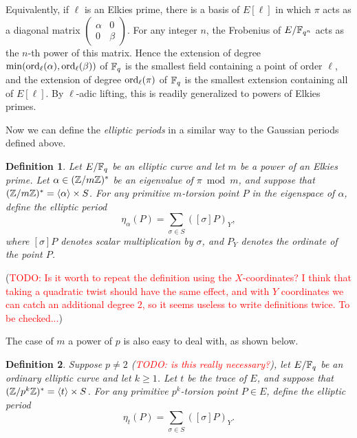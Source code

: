 \documentclass{article}
\newcommand{\todo}[1]{(\textcolor{red}{TODO: #1})}
\newtheorem{Def}{Definition}
\begin{document}
Equivalently, if $\ell$ is an Elkies prime, there is a basis of
$E[\ell]$ in which $\pi$ acts as a diagonal matrix
$\left(\begin{smallmatrix}\alpha&0\\0&\beta\end{smallmatrix}\right)$. For
any integer $n$, the Frobenius of $E/\mathbb{F}_{q^n}$ acts as the $n$-th
power of this matrix. Hence the extension of degree
$\min(\operatorname{ord}_\ell(\alpha),\operatorname{ord}_\ell(\beta))$ of $\mathbb{F}_q$ is the smallest
field containing a point of order $\ell$, and the extension of degree
$\operatorname{ord}_\ell(\pi)$ of $\mathbb{F}_q$ is the smallest extension containing all of
$E[\ell]$. By $\ell$-adic lifting, this is readily generalized to
powers of Elkies primes.

Now we can define the \emph{elliptic periods} in a similar way to the
Gaussian periods defined above.

\begin{Def}
  Let $E/\mathbb{F}_q$ be an elliptic curve and let $m$ be a power of an
  Elkies prime. Let $\alpha\in(\mathbb{Z}/m\mathbb{Z})^\ast$ be an eigenvalue of
  $\pi\bmod m$, and suppose that
  $(\mathbb{Z}/m\mathbb{Z})^\ast=\langle\alpha\rangle\times S$. For any primitive
  $m$-torsion point $P$ in the eigenspace of $\alpha$, define the
  elliptic period
  \begin{equation}
    \eta_\alpha(P) = \sum_{\sigma\in S} ([\sigma]P)_Y,
  \end{equation}
  where $[\sigma]P$ denotes scalar multiplication by $\sigma$, and
  $P_Y$ denotes the ordinate of the point $P$.
\end{Def}

\todo{Is it worth to repeat the definition using the $X$-coordinates?
  I think that taking a quadratic twist should have the same effect,
  and with $Y$ coordinates we can catch an additional degree $2$, so
  it seems useless to write definitions twice. To be checked...}

The case of $m$ a power of $p$ is also easy to deal with, as shown
below.

\begin{Def}
  Suppose $p\ne2$ \todo{is this really necessary?}, let $E/\mathbb{F}_q$ be an
  ordinary elliptic curve and let $k\ge1$. Let $t$ be the trace of
  $E$, and suppose that $(\mathbb{Z}/p^k\mathbb{Z})^\ast=\langle t\rangle\times
  S$. For any primitive $p^k$-torsion point $P\in E$, define the
  elliptic period
  \begin{equation}
    \eta_t(P) = \sum_{\sigma\in S} ([\sigma]P)_Y.
  \end{equation}
\end{Def}
\end{document}
